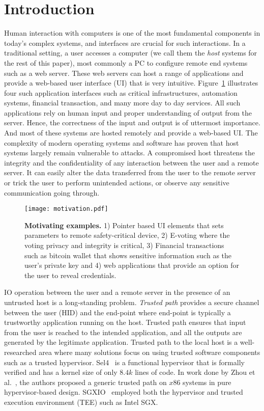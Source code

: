\section{Introduction}
\label{sec:intro}

Human interaction with computers is one of the most fundamental components in today's complex systems, and interfaces are crucial for such interactions. In a traditional setting, a user accesses a computer (we call them the \emph{host} systems for the rest of this paper), most commonly a PC to configure remote end systems such as a web server. These web servers can host a range of applications and provide a web-based user interface (UI) that is very intuitive. Figure~\ref{fig:motivation} illustrates four such application interfaces such as critical infrastructures, automation systems, financial transaction, and many more day to day services. All such applications rely on human input and proper understanding of output from the server. Hence, the correctness of the input and output is of uttermost importance. And most of these systems are hosted remotely and provide a web-based UI. The complexity of modern operating systems and software has proven that host systems largely remain vulnerable to attacks. A compromised host threatens the integrity and the confidentiality of any interaction between the user and a remote server. It can easily alter the data transferred from the user to the remote server or trick the user to perform unintended actions, or observe any sensitive communication going through.

\begin{figure}[t]
\centering
\texttt{[image: motivation.pdf]}
\caption{\textbf{Motivating examples.} 1) Pointer based UI elements that sets parameters to remote safety-critical device, 2) E-voting where the voting privacy and integrity is critical, 3) Financial transactions such as bitcoin wallet that shows sensitive information such as the user's private key and 4) web applications that provide an option for the user to reveal credentials.}
\spacesave
\label{fig:motivation}
\centering
\end{figure}


IO operation between the user and a remote server in the presence of an untrusted host is a long-standing problem. \emph{Trusted path} provides a secure channel between the user (HID) and the end-point where end-point is typically a trustworthy application running on the host. Trusted path ensures that input from the user is reached to the intended application, and all the outputs are generated by the legitimate application. Trusted path to the local host is a well-researched area where many solutions focus on using trusted software components such as a trusted hypervisor. Sel4~\cite{klein2009sel4} is a functional hypervisor that is formally verified and has a kernel size of only $8.4k$ lines of code. In work done by Zhou et al.~\cite{zhou2012building}, the authors proposed a generic trusted path on $x86$ systems in pure hypervisor-based design. SGXIO~\cite{weiser2017sgxio} employed both the hypervisor and trusted execution environment (TEE) such as Intel SGX.

